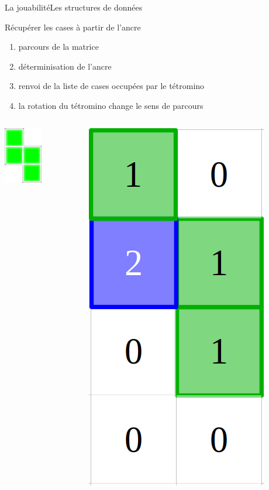 \documentclass[french]{beamer}
\begin{document}
			\begin{frame}{La jouabilité}{Les structures de données}	

				\begin{block}{Récupérer les cases à partir de l'ancre}
					\begin{enumerate}
						\item parcours de la matrice
						\item déterminisation de l'ancre
						\item renvoi de la liste de cases occupées par le tétromino
						\item la rotation du tétromino change le sens de parcours
					\end{enumerate}
				\end{block}
				
				\begin{columns}
					\begin{column}{0.1\textwidth}
						\begin{center}
							\includegraphics[scale=0.5]{img/2.png}
						\end{center}
					\end{column}
					\begin{column}{0.1\textwidth}
						\begin{center}
							\includegraphics[scale=0.1]{img/tetro.png}
						\end{center}
					\end{column}
				\end{columns}
			\end{frame}
\end{document}
